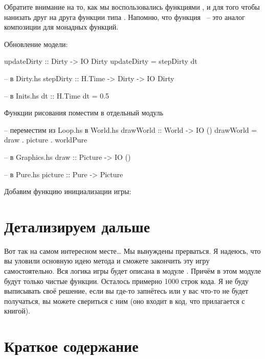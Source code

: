Обратите внимание на то, как мы воспользовались
функциями ,  и \In{<=<}
для того чтобы нанизать друг на друга функции
типа . Напомню, что 
функция \In{<=<}~-- это аналог композиции
для монадных функций. 

Обновление модели:

\begin{code}
updateDirty :: Dirty -> IO Dirty
updateDirty = stepDirty dt

-- в Dirty.hs
stepDirty :: H.Time -> Dirty -> IO Dirty

-- в Inits.hs
dt :: H.Time
dt = 0.5
\end{code}

Функции рисования поместим в отдельный модуль 

\begin{code}
-- переместим из Loop.hs в World.hs 
drawWorld :: World -> IO ()
drawWorld = draw . picture . worldPure

-- в Graphics.hs
draw :: Picture -> IO ()

-- в Pure.hs
picture     :: Pure -> Picture
\end{code}

Добавим функцию инициализации игры:


\section{Детализируем дальше}

Вот так на самом интересном месте\dots 
Мы вынуждены прерваться. Я надеюсь, что вы уловили 
основную идею метода и сможете закончить эту игру
самостоятельно. Вся логика игры будет описана
в модуле . Причём в этом модуле будут
только чистые функции. Осталось примерно 1000 строк 
кода. Я не буду выписывать своё решение, если 
вы где-то запнётесь или у вас что-то не будет получаться,
вы можете свериться с ним (оно входит в код, что
прилагается с книгой). 

\section{Краткое содержание}

